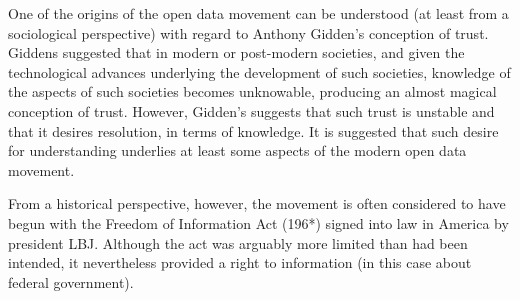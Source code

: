 One of the origins of the open data movement can be understood (at least from a sociological perspective) with regard to Anthony Gidden’s conception of trust. Giddens suggested that in modern or post-modern societies, and given the technological advances underlying the development of such societies, knowledge of the aspects of such societies becomes unknowable, producing an almost magical conception of trust. However, Gidden’s suggests that such trust is unstable and that it desires resolution, in terms of knowledge. It is suggested that such desire for understanding underlies at least some aspects of the modern open data movement.

From a historical perspective, however, the movement is often considered to have begun with the Freedom of Information Act (196*) signed into law in America by president LBJ. Although the act was arguably more limited than had been intended, it nevertheless provided a right to information (in this case about federal government).